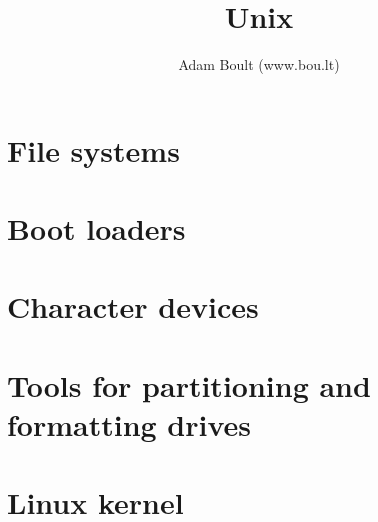 \documentclass[oneside]{book}
\begin{document}
\author{Adam Boult (www.bou.lt)}
\title{Unix}
\maketitle

\setcounter{tocdepth}{0}
\tableofcontents



\part{File systems}




\part{Boot loaders}



\part{Character devices}


\part{Tools for partitioning and formatting drives}



\part{Linux kernel}






\end{document}
